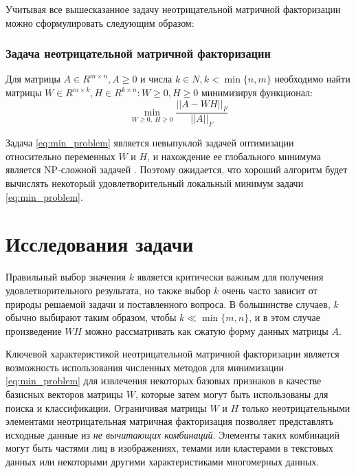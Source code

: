 \newpage

Учитывая все вышесказанное задачу неотрицательной матричной факторизации можно сформулировать следующим образом:

\subsubsection{Задача неотрицательной матричной факторизации}

Для матрицы $A \in R^{m \times n}, A \geq 0$ и числа $k \in N, k < \min\{n, m\}$
необходимо найти матрицы $W \in R^{m \times k}, H \in R^{k \times n} : W \geq 0, H \geq 0$ минимизируя функционал:
\begin{equation} \label{eq:min_problem}
  \min_{W \geq 0, \ H \geq 0} \dfrac{||A - WH||_F}{|| A ||_F}
\end{equation}

Задача \eqref{eq:min_problem} является невыпуклой задачей оптимизации относительно переменных $W$ и $H$,
и нахождение ее глобального минимума является NP-сложной задачей \cite{vavaris}.
Поэтому ожидается, что хороший алгоритм будет вычислять некоторый удовлетворительный локальный минимум задачи \eqref{eq:min_problem}.






\section{Исследования задачи}

Правильный выбор значения $k$ является критически важным для получения удовлетворительного результата,
но также выбор $k$ очень часто зависит от природы решаемой задачи и поставленного вопроса.
В большинстве случаев, $k$ обычно выбирают таким образом, чтобы $k \ll \min\{m, n\}$,
и в этом случае произведение $WH$ можно рассматривать как сжатую форму данных матрицы $A$.

Ключевой характеристикой неотрицательной матричной факторизации является возможность
использования численных методов для минимизации \eqref{eq:min_problem}
для извлечения некоторых базовых признаков в качестве базисных векторов матрицы $W​$,
которые затем могут быть использованы для поиска и классификации.
Ограничивая матрицы $W​$ и $H​$ только неотрицательными элементами
неотрицательная матричная факторизация позволяет представлять исходные данные из \textit{не вычитающих комбинаций}.
Элементы таких комбинаций могут быть частями лиц в изображениях, темами или кластерами в текстовых данных
или некоторыми другими характеристиками многомерных данных.

